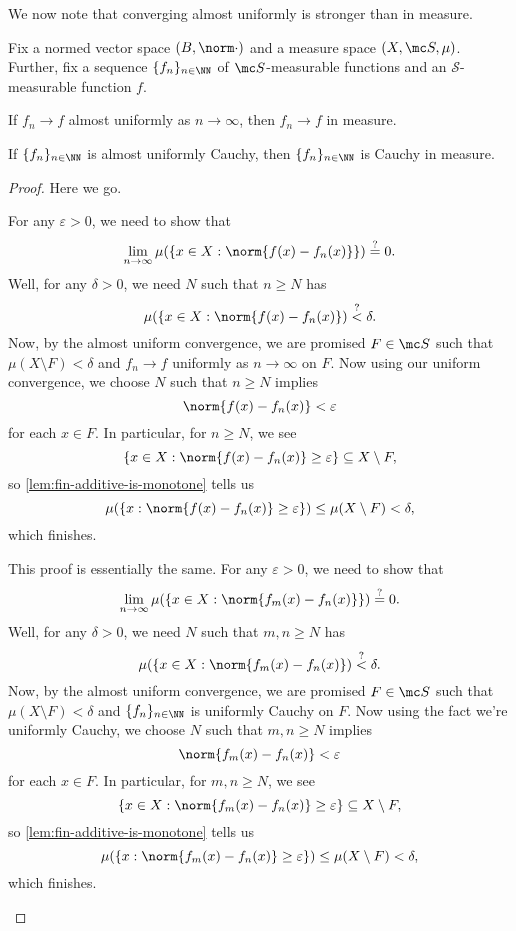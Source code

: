 \documentclass[../notes.tex]{subfiles}
\begin{document}
We now note that converging almost uniformly is stronger than in measure.
\begin{lemma} \label{lem:almost-uniform-to-in-measure}
	Fix a normed vector space $(B,\norm\cdot)$ and a measure space $(X,\mc S,\mu)$. Further, fix a sequence $\{f_n\}_{n\in\NN}$ of $\mc S$-measurable functions and an $\mathcal S$-measurable function $f$.
	\begin{listalph}
		\item If $f_n\to f$ almost uniformly as $n\to\infty$, then $f_n\to f$ in measure.
		\item If $\{f_n\}_{n\in\NN}$ is almost uniformly Cauchy, then $\{f_n\}_{n\in\NN}$ is Cauchy in measure.
	\end{listalph}
\end{lemma}
\begin{proof}
	Here we go.
	\begin{listalph}
		\item For any $\varepsilon>0$, we need to show that
		\[\lim_{n\to\infty}\mu(\{x\in X:\norm{f(x)-f_n(x)}\})\stackrel?=0.\]
		Well, for any $\delta>0$, we need $N$ such that $n\ge N$ has
		\[\mu(\{x\in X:\norm{f(x)-f_n(x)})\stackrel?<\delta.\]
		Now, by the almost uniform convergence, we are promised $F\in\mc S$ such that $\mu(X\setminus F)<\delta$ and $f_n\to f$ uniformly as $n\to\infty$ on $F$. Now using our uniform convergence, we choose $N$ such that $n\ge N$ implies
		\[\norm{f(x)-f_n(x)}<\varepsilon\]
		for each $x\in F$. In particular, for $n\ge N$, we see
		\[\{x\in X:\norm{f(x)-f_n(x)}\ge\varepsilon\}\subseteq X\setminus F,\]
		so \autoref{lem:fin-additive-is-monotone} tells us
		\[\mu(\{x:\norm{f(x)-f_n(x)}\ge\varepsilon\})\le\mu(X\setminus F)<\delta,\]
		which finishes.
		\item This proof is essentially the same. For any $\varepsilon>0$, we need to show that
		\[\lim_{n\to\infty}\mu(\{x\in X:\norm{f_m(x)-f_n(x)}\})\stackrel?=0.\]
		Well, for any $\delta>0$, we need $N$ such that $m,n\ge N$ has
		\[\mu(\{x\in X:\norm{f_m(x)-f_n(x)})\stackrel?<\delta.\]
		Now, by the almost uniform convergence, we are promised $F\in\mc S$ such that $\mu(X\setminus F)<\delta$ and $\{f_n\}_{n\in\NN}$ is uniformly Cauchy on $F$. Now using the fact we're uniformly Cauchy, we choose $N$ such that $m,n\ge N$ implies
		\[\norm{f_m(x)-f_n(x)}<\varepsilon\]
		for each $x\in F$. In particular, for $m,n\ge N$, we see
		\[\{x\in X:\norm{f_m(x)-f_n(x)}\ge\varepsilon\}\subseteq X\setminus F,\]
		so \autoref{lem:fin-additive-is-monotone} tells us
		\[\mu(\{x:\norm{f_m(x)-f_n(x)}\ge\varepsilon\})\le\mu(X\setminus F)<\delta,\]
		which finishes.
		\qedhere
	\end{listalph}
\end{proof}
\end{document}
